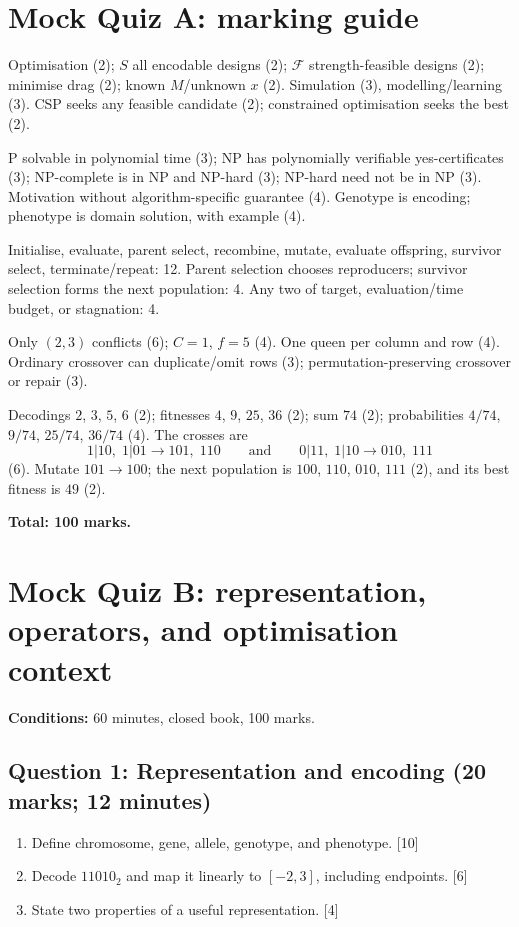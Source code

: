 \documentclass[11pt,a4paper]{article}
\begin{document}
\clearpage
\section{Mock Quiz A: marking guide}
\begin{description}[leftmargin=0pt,labelindent=0pt]
\item[Q1 (20).] Optimisation (2); $S$ all encodable designs (2); $\mathcal F$ strength-feasible designs (2); minimise drag (2); known $M$/unknown $x$ (2). Simulation (3), modelling/learning (3). CSP seeks any feasible candidate (2); constrained optimisation seeks the best (2).
\item[Q2 (20).] P solvable in polynomial time (3); NP has polynomially verifiable yes-certificates (3); NP-complete is in NP and NP-hard (3); NP-hard need not be in NP (3). Motivation without algorithm-specific guarantee (4). Genotype is encoding; phenotype is domain solution, with example (4).
\item[Q3 (20).] Initialise, evaluate, parent select, recombine, mutate, evaluate offspring, survivor select, terminate/repeat: 12. Parent selection chooses reproducers; survivor selection forms the next population: 4. Any two of target, evaluation/time budget, or stagnation: 4.
\item[Q4 (20).] Only $(2,3)$ conflicts (6); $C=1$, $f=5$ (4). One queen per column and row (4). Ordinary crossover can duplicate/omit rows (3); permutation-preserving crossover or repair (3).
\item[Q5 (20).] Decodings $2$, $3$, $5$, $6$ (2); fitnesses $4$, $9$,
$25$, $36$ (2); sum $74$ (2); probabilities $4/74$, $9/74$, $25/74$,
$36/74$ (4). The crosses are
\[
1|10,\;1|01\to101,\;110
\qquad\text{and}\qquad
0|11,\;1|10\to010,\;111
\]
(6). Mutate $101\to100$; the next population is $100$, $110$, $010$,
$111$ (2), and its best fitness is $49$ (2).
\end{description}
\noindent\textbf{Total: 100 marks.}

\clearpage
\section{Mock Quiz B: representation, operators, and optimisation context}
\noindent\textbf{Conditions:} 60 minutes, closed book, 100 marks.

\subsection*{Question 1: Representation and encoding (20 marks; 12 minutes)}
\begin{enumerate}[label=(\alph*)]
\item Define chromosome, gene, allele, genotype, and phenotype. \hfill[10]
\item Decode $11010_2$ and map it linearly to $[-2,3]$, including endpoints. \hfill[6]
\item State two properties of a useful representation. \hfill[4]
\end{enumerate}
\end{document}
